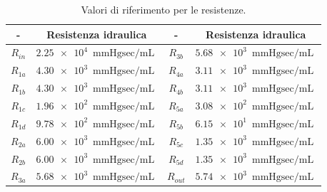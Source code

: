 \documentclass{article}
\begin{document}
\begin{table}[h!]
\begin{center}
\begin{tabular}{| c | c || c | c |}
\hline
- & \textbf{Resistenza idraulica} & - & \textbf{Resistenza idraulica}\\
\hline
$R_{in}$ & $\SI{2.25e4}{\mmHg \sec \per \milli \liter}$ & $R_{3b}$ & $ \SI{5.68e3}{\mmHg \sec \per \milli \liter}$ \\
$R_{1a}$ & $\SI{4.30e3}{\mmHg \sec \per \milli \liter}$ & $R_{4a}$ & $ \SI{3.11e3}{\mmHg \sec \per \milli \liter}$ \\
$R_{1b}$ & $ \SI{4.30e3}{\mmHg \sec \per \milli \liter}$ & $R_{4b}$ & $ \SI{3.11e3}{\mmHg \sec \per \milli \liter}$ \\
$R_{1c}$ & $ \SI{1.96e2}{\mmHg \sec \per \milli \liter}$ & $R_{5a}$ & $ \SI{3.08e2}{\mmHg \sec \per \milli \liter}$ \\
$R_{1d}$ & $ \SI{9.78e2}{\mmHg \sec \per \milli \liter}$ & $R_{5b}$ & $ \SI{6.15e1}{\mmHg \sec \per \milli \liter}$ \\
$R_{2a}$ & $ \SI{6.00e3}{\mmHg \sec \per \milli \liter}$ & $R_{5c}$ & $ \SI{1.35e3}{\mmHg \sec \per \milli \liter}$ \\
$R_{2b}$ & $ \SI{6.00e3}{\mmHg \sec \per \milli \liter}$ & $R_{5d}$ & $ \SI{1.35e3}{\mmHg \sec \per \milli \liter}$ \\
$R_{3a}$ & $ \SI{5.68e3}{\mmHg \sec \per \milli \liter}$ & $R_{out}$ & $ \SI{5.74e3}{\mmHg \sec \per \milli \liter}$ \\
\hline
\end{tabular}
\caption{Valori di riferimento per le resistenze.}
\label{tab_resistori}
\end{center}
\end{table}
\end{document}

